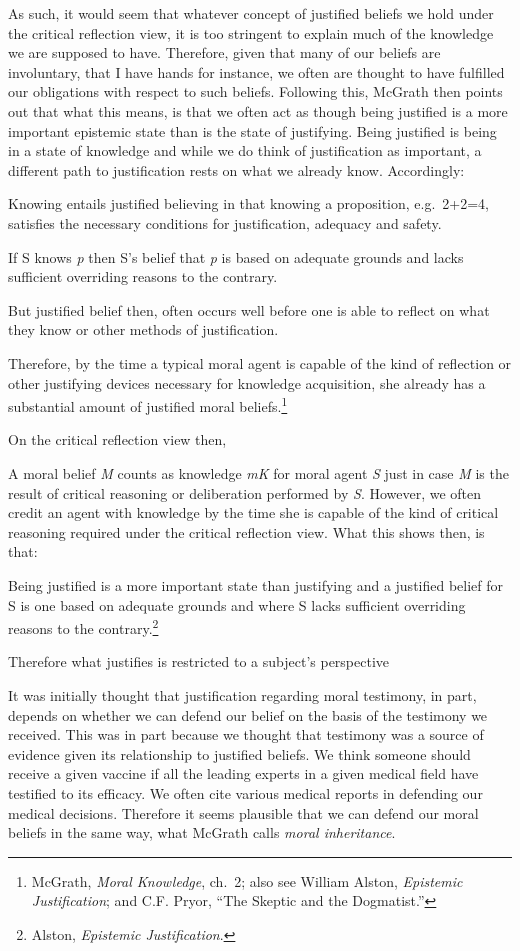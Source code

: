 \documentclass[phdthesis,12pt,final]{wuthesis}
\theoremstyle{definition}
\theoremstyle{definition}
\theoremstyle{definition}
\theoremstyle{definition}
\theoremstyle{remark}
\begin{document}
As such, it would seem that whatever concept of justified beliefs we hold under the critical reflection view, it is too stringent to explain much of the knowledge we are supposed to have. Therefore, given that many of our beliefs are involuntary, that I have hands for instance, we often are thought to have fulfilled our obligations with respect to such beliefs. Following this, McGrath then points out that what this means, is that we often act as though being justified is a more important epistemic state than is the state of justifying. Being justified is being in a state of knowledge and while we do think of justification as important, a different path to justification rests on what we already know. Accordingly:

Knowing entails justified believing in that knowing a proposition, e.g.~2+2=4, satisfies the necessary conditions for justification, adequacy and safety.

If S knows \emph{p} then S's belief that \emph{p} is based on adequate grounds and lacks sufficient overriding reasons to the contrary.

But justified belief then, often occurs well before one is able to reflect on what they know or other methods of justification.

Therefore, by the time a typical moral agent is capable of the kind of reflection or other justifying devices necessary for knowledge acquisition, she already has a substantial amount of justified moral beliefs.\footnote{McGrath, \emph{Moral {Knowledge}}, ch.~2; also see William Alston, \emph{Epistemic Justification}; and C.F. Pryor, {``The {Skeptic} and the {Dogmatist}.''}}

On the critical reflection view then,

A moral belief \emph{M} counts as knowledge \emph{mK} for moral agent \emph{S} just in case \emph{M} is the result of critical reasoning or deliberation performed by \emph{S}. However, we often credit an agent with knowledge by the time she is capable of the kind of critical reasoning required under the critical reflection view. What this shows then, is that:

Being justified is a more important state than justifying and a justified belief for S is one based on adequate grounds and where S lacks sufficient overriding reasons to the contrary.\footnote{Alston, \emph{Epistemic Justification}.}

Therefore what justifies is restricted to a subject's perspective

It was initially thought that justification regarding moral testimony, in part, depends on whether we can defend our belief on the basis of the testimony we received. This was in part because we thought that testimony was a source of evidence given its relationship to justified beliefs. We think someone should receive a given vaccine if all the leading experts in a given medical field have testified to its efficacy. We often cite various medical reports in defending our medical decisions. Therefore it seems plausible that we can defend our moral beliefs in the same way, what McGrath calls \emph{moral inheritance}.
\end{document}
